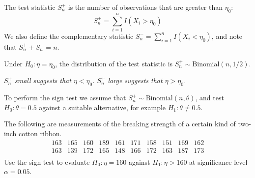 The test statistic $S^{+}_n$ is the number of observations that are greater than $\eta_0$: 
\[
S^{+}_n = \sum_{i=1}^n I(X_i>\eta_0) 
\]
We also define the complementary statistic $S^{-}_n = \displaystyle\sum_{i=1}^n I(X_i<\eta_0)$, and note that $S^{+}_n + S^{-}_n = n$.

Under $H_0:\eta=\eta_0$, the distribution of the test statistic is $S^{+}_n\sim\text{Binomial}(n,1/2)$.


\bit
\it $S^{+}_n$ small suggests that $\eta < \eta_0$.
\it $S^{+}_n$ large suggests that $\eta > \eta_0$.
\eit


To perform the sign test we assume that $S^{+}_n\sim\text{Binomial}(n,\theta)$, and test $H_0:\theta = 0.5$ against a suitable alternative, for example $H_1:\theta\neq 0.5$. 


\begin{example}
The following are measurements of the breaking strength of a certain kind of two-inch cotton ribbon.
\[\begin{array}{cccccccccc}
163 & 165 & 160 & 189 & 161 & 171 & 158 & 151 & 169 & 162 \\
163 & 139 & 172 & 165 & 148 & 166 & 172 & 163 & 187 & 173 \\
\end{array}\]
Use the sign test to evaluate $H_0:\eta=160$ against $H_1:\eta>160$ at significance level $\alpha=0.05$.
\end{example}


